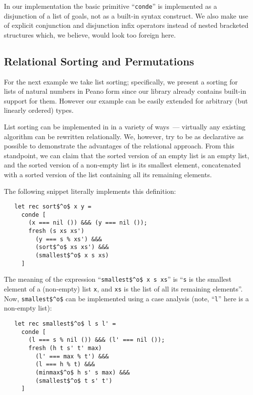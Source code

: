 In our implementation the basic \miniKanren primitive ``\lstinline{conde}'' is implemented as a
disjunction of a list of goals, not as a built-in syntax construct. We also make use of explicit
conjunction and disjunction infix operators instead of nested bracketed structures which, we
believe, would look too foreign here.

\subsection{Relational Sorting and Permutations}

For the next example we take list sorting; specifically, we present a sorting for lists of natural numbers
in Peano form since our library already contains built-in support for them. However our example can be
easily extended for arbitrary (but linearly ordered) types.

List sorting can be implemented in \miniKanren in a variety of ways~--- virtually any existing algorithm can
be rewritten relationally. We, however, try to be as declarative as possible to demonstrate the
advantages of the relational approach. From this standpoint, we can claim that the sorted version of an empty list is an
empty list, and the sorted version of a non-empty list is its smallest element, concatenated with a sorted
version of the list containing all its remaining elements.

The following snippet literally implements this definition:

\begin{lstlisting}
   let rec sort$^o$ x y =
     conde [
       (x === nil ()) &&& (y === nil ());
       fresh (s xs xs')
         (y === s % xs') &&&
         (sort$^o$ xs xs') &&&
         (smallest$^o$ x s xs)
     ]
\end{lstlisting}

The meaning of the expression ``\lstinline{smallest$^o$ x s xs}'' is ``\lstinline{s} is the smallest element of a (non-empty) list \lstinline{x}, and \lstinline{xs} is the
list of all its remaining elements''. Now, \lstinline{smallest$^o$} can be implemented using a case analysis (note, ``\lstinline{l}'' here is a non-empty list):

\begin{lstlisting}
   let rec smallest$^o$ l s l' =
     conde [
       (l === s % nil ()) &&& (l' === nil ());
       fresh (h t s' t' max)
         (l' === max % t') &&&
         (l === h % t) &&&
         (minmax$^o$ h s' s max) &&&
         (smallest$^o$ t s' t')
     ]
\end{lstlisting}

